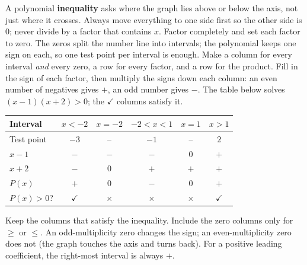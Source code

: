 \documentclass[11pt]{article}
\begin{document}
\begin{learnbox}
A polynomial \textbf{inequality} asks where the graph lies above or below the axis, not just where it crosses. Always move everything to one side first so the other side is $0$; never divide by a factor that contains $x$.
Factor completely and set each factor to zero. The zeros split the number line into intervals; the polynomial keeps one sign on each, so one test point per interval is enough.
Make a column for every interval \emph{and} every zero, a row for every factor, and a row for the product. Fill in the sign of each factor, then multiply the signs down each column: an even number of negatives gives $+$, an odd number gives $-$. The table below solves $(x-1)(x+2)>0$; the $\checkmark$ columns satisfy it.\par\begin{center}\small\setlength{\tabcolsep}{4pt}\renewcommand{\arraystretch}{1.2}
\begin{tabular}{l|ccccc}
\hline
Interval & $x<-2$ & $x=-2$ & $-2<x<1$ & $x=1$ & $x>1$ \\ \hline
Test point & $-3$ & -- & $-1$ & -- & $2$ \\ \hline
$x-1$ & $-$ & $-$ & $-$ & $0$ & $+$ \\
$x+2$ & $-$ & $0$ & $+$ & $+$ & $+$ \\
\hline
$P(x)$ & $+$ & $0$ & $-$ & $0$ & $+$ \\ \hline
$P(x)>0$? & $\checkmark$ & $\times$ & $\times$ & $\times$ & $\checkmark$ \\ \hline
\end{tabular}\end{center}
Keep the columns that satisfy the inequality. Include the zero columns only for $\ge$ or $\le$. An odd-multiplicity zero changes the sign; an even-multiplicity zero does not (the graph touches the axis and turns back). For a positive leading coefficient, the right-most interval is always $+$.
\end{learnbox}

\end{document}
